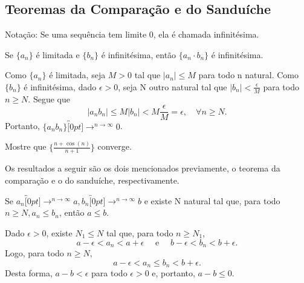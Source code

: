 \documentclass[analysis_notes.tex]{subfiles}
\begin{document}
\subsection{Teoremas da Compara\c c\~ao e do Sandu\'iche}
Nota\c c\~ao: Se uma sequ\^encia tem limite 0, ela \'e chamada infinit\'esima.
\begin{theorem*}
	Se $\{a_{n}\}$ \'e limitada e $\{b_{n}\}$ \'e infinit\'esima, ent\~ao $\{a_{n}\cdot b_{n}\} $ \'e infinit\'esima.
\end{theorem*}
\begin{proof*}
	Como $\{a_{n}\}$ \'e limitada, seja $M > 0$ tal que $|a_{n}|\leq{M}$ para todo n natural. Como $\{b_{n}\} $ \'e infinit\'esima, dado $\epsilon > 0$,
	seja N outro natural tal que $|b_{n}|<\frac{\epsilon}{M}$ para todo $n\geq{N}.$ Segue que
	$$
		|a_{n}b_{n}| \leq{M|b_{n}|} < M \frac{\epsilon}{M} = \epsilon,\quad \forall n\geq{N}.
	$$
	Portanto, $\{a_{n}b_{n}\}\overbracket[0pt]{\longrightarrow}^{n\to \infty}0$.\qedsymbol
\end{proof*}
\begin{example}
	Mostre que $\biggl\{\frac{n+\cos{(n)}}{n+1}\biggr\}$ converge.
\end{example}
Os resultados a seguir s\~ao os dois mencionados previamente, o teorema da compara\c c\~ao e o do sandu\'iche, respectivamente.
\begin{theorem*}
	Se $a_{n}\overbracket[0pt]{\longrightarrow}^{n\to \infty}a, b_{n}\overbracket[0pt]{\longrightarrow}^{n\to \infty}b$ e existe N natural tal que,
	para todo $n\geq{N}, a_{n}\leq{b_{n}}$, ent\~ao $a\leq{b}.$
\end{theorem*}
\begin{proof*}
	Dado $\epsilon > 0$, existe $N_{1}\leq{N}$ tal que, para todo $n\geq{N_{1}}$,
	$$
		a - \epsilon < a_{n} < a + \epsilon\quad\text{ e }\quad b-\epsilon < b_{n} < b + \epsilon.
	$$
	Logo, para todo $n\geq{N},$
	$$
		a-\epsilon < a_{n} \leq{b_{n}} < b + \epsilon.
	$$
	Desta forma, $a-b < \epsilon$ para todo $\epsilon > 0$ e, portanto, $a - b\leq{0}.$\qedsymbol
\end{proof*}
\end{document}
